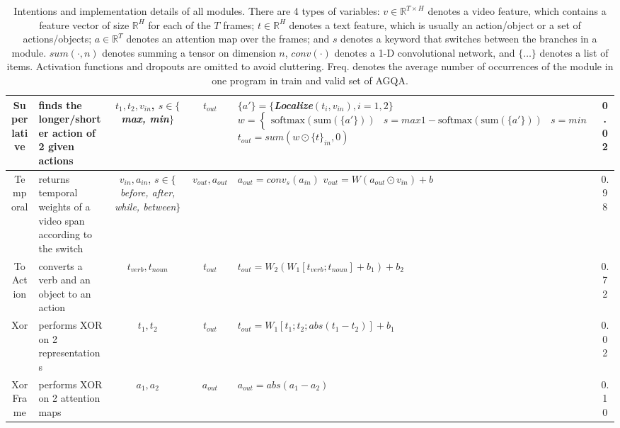 \documentclass[letterpaper]{article} %
\begin{document}
\begin{table}[t]
{\begin{tabular}{cm{4cm}cclc}
        Superlative & finds the longer/shorter action of 2 given actions & \makecell[c]{$t_1, t_2, v_{in}$, \\ $s \in \{$\textit{max, min}$\}$} & $t_{out}$ &
            \makecell[l]{
                $\{a'\}=\{$\textit{Localize}$(t_i, v_{in}), i=1,2\}$ \\
                $ w = \begin{cases}
                    \text{softmax}(\text{sum}(\{a'\})) & s=\mathit{max} \\
                    1-\text{softmax}(\text{sum}(\{a'\})) & s=\mathit{min} \\
                \end{cases} $ \\
                $t_{out}=sum(w \odot \{t\}_{in},0)$
            } & 0.02 \\
        \hline

        Temporal & returns temporal weights of a video span according to the switch & \makecell[c]{$v_{in}, a_{in}$, \\ $s \in \{$\textit{before, after,} \\ \textit{while, between}$\}$} & $v_{out}, a_{out}$ &
            \makecell[l]{
                $a_{out}=conv_{s}(a_{in})$ \\
                $v_{out}=W(a_{out} \odot v_{in})+b$ \\
            } & 0.98
        \\
        \hline

        ToAction & converts a verb and an object to an action & $t_{verb}, t_{noun}$ & $t_{out}$ & $t_{out}=W_2(W_1[t_{verb};t_{noun}]+b_1)+b_2$ & 0.72 \\
        \hline

        Xor & performs XOR on 2 representations & $t_1, t_2$ & $t_{out}$ & $t_{out}=W_1[t_1;t_2; abs(t_1-t_2)]+b_1$ & 0.02 \\
        \hline

        XorFrame & performs XOR on 2 attention maps & $a_1, a_2$ & $a_{out}$ & $a_{out}=abs(a_1-a_2)$ & 0.10 \\
        \hline
    \end{tabular}
}
    \caption{Intentions and implementation details of all modules. There are 4 types of variables: $v \in \mathbb{R}^{T \times H}$ denotes a video feature, which contains a feature vector of size $\mathbb{R}^H$ for each of the $T$ frames; $t \in \mathbb{R}^H$ denotes a text feature, which is usually an action/object or a set of actions/objects; $a \in \mathbb{R}^T$ denotes an attention map over the frames; and $s$ denotes a keyword that switches between the branches in a module. $sum(\cdot, n)$ denotes summing a tensor on dimension $n$, $conv(\cdot)$ denotes a 1-D convolutional network, and $\{\dotsc\}$ denotes a list of items. Activation functions and dropouts are omitted to avoid cluttering. Freq. denotes the average number of occurrences of the module in one program in train and valid set of AGQA.}
    \label{tab:modules}
\end{table}
\end{document}
